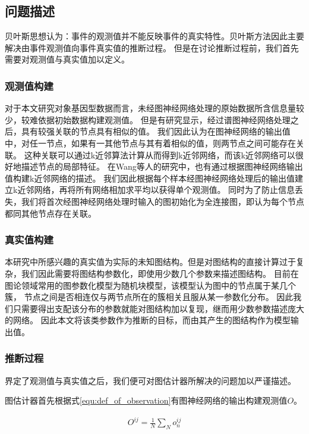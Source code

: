\subsection{问题描述}
贝叶斯思想认为：事件的观测值并不能反映事件的真实特性。贝叶斯方法因此主要解决由事件观测值向事件真实值的推断过程。
但是在讨论推断过程前，我们首先需要对观测值与真实值加以定义。
\subsubsection{观测值构建}
对于本文研究对象基因型数据而言，未经图神经网络处理的原始数据所含信息量较少，较难依据初始数据构建观测值。
但是有研究显示，经过谱图神经网络处理之后，具有较强关联的节点具有相似的值\cite{hamilton_inductive_2018}。
我们因此认为在图神经网络的输出值中，对任一节点，如果有一其他节点与其有着相似的值，则两节点之间可能存在关联。
这种关联可以通过k近邻算法\cite{preparata_computational_1985}计算从而得到k近邻网络，而该k近邻网络可以很好地描述节点的局部特征。
在Wang\cite{wang_graph_2021}等人的研究中，也有通过根据图神经网络输出值构建k近邻网络的描述。
我们因此根据每个样本经图神经网络处理后的输出值建立k近邻网络，再将所有网络相加求平均以获得单个观测值。
同时为了防止信息丢失，我们将首次经图神经网络处理时输入的图初始化为全连接图，即认为每个节点都同其他节点存在关联。

\subsubsection{真实值构建}

本研究中所感兴趣的真实值为实际的未知图结构。但是对图结构的直接计算过于复杂，我们因此需要将图结构参数化，即使用少数几个参数来描述图结构。
目前在图论领域常用的图参数化模型为随机块模型\cite{holland_stochastic_1983}，该模型认为图中的节点属于某几个簇，
节点之间是否相连仅与两节点所在的簇相关且服从某一参数化分布。
因此我们只需要得出支配该分布的参数就能对图结构加以复现，继而用少数参数描述庞大的网络。
因此本文将该类参数作为推断的目标，而由其产生的图结构作为模型输出值。

\subsubsection{推断过程}

界定了观测值与真实值之后，我们便可对图估计器所解决的问题加以严谨描述。

图估计器首先根据式\ref{equ:def_of_observation}有图神经网络的输出构建观测值$O$。

\begin{equation}\label{equ:def_of_observation}\begin{aligned}
    O^{ij}=\frac{1}{N}\sum_N o^{ij}_n
\end{aligned}\end{equation}

